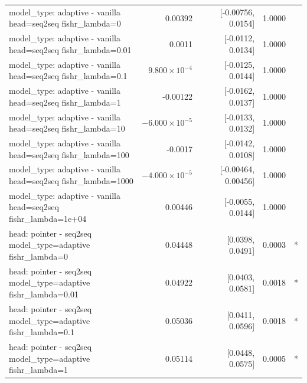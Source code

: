 \documentclass[10pt]{article}
\makeatletter
\newcommand{\stackcell}[1]{\begin{tabular}[t]{@{}l@{}}#1\end{tabular}}
\makeatother
\begin{document}
{\begin{longtable}{lrrrl}
\stackcell{model\_type: adaptive - vanilla\\\footnotesize head=seq2seq fishr\_lambda=0 } & 0.00392 & [-0.00756, 0.0154] & 1.0000 & \\
\stackcell{model\_type: adaptive - vanilla\\\footnotesize head=seq2seq fishr\_lambda=0.01 } & 0.0011 & [-0.0112, 0.0134] & 1.0000 & \\
\stackcell{model\_type: adaptive - vanilla\\\footnotesize head=seq2seq fishr\_lambda=0.1 } & $9.800\times10^{-4}$ & [-0.0125, 0.0144] & 1.0000 & \\
\stackcell{model\_type: adaptive - vanilla\\\footnotesize head=seq2seq fishr\_lambda=1 } & -0.00122 & [-0.0162, 0.0137] & 1.0000 & \\
\stackcell{model\_type: adaptive - vanilla\\\footnotesize head=seq2seq fishr\_lambda=10 } & $-6.000\times10^{-5}$ & [-0.0133, 0.0132] & 1.0000 & \\
\stackcell{model\_type: adaptive - vanilla\\\footnotesize head=seq2seq fishr\_lambda=100 } & -0.0017 & [-0.0142, 0.0108] & 1.0000 & \\
\stackcell{model\_type: adaptive - vanilla\\\footnotesize head=seq2seq fishr\_lambda=1000 } & $-4.000\times10^{-5}$ & [-0.00464, 0.00456] & 1.0000 & \\
\stackcell{model\_type: adaptive - vanilla\\\footnotesize head=seq2seq fishr\_lambda=1e+04 } & 0.00446 & [-0.0055, 0.0144] & 1.0000 & \\
\stackcell{head: pointer - seq2seq\\\footnotesize model\_type=adaptive fishr\_lambda=0 } & 0.04448 & [0.0398, 0.0491] & 0.0003 & *\\
\stackcell{head: pointer - seq2seq\\\footnotesize model\_type=adaptive fishr\_lambda=0.01 } & 0.04922 & [0.0403, 0.0581] & 0.0018 & *\\
\stackcell{head: pointer - seq2seq\\\footnotesize model\_type=adaptive fishr\_lambda=0.1 } & 0.05036 & [0.0411, 0.0596] & 0.0018 & *\\
\stackcell{head: pointer - seq2seq\\\footnotesize model\_type=adaptive fishr\_lambda=1 } & 0.05114 & [0.0448, 0.0575] & 0.0005 & *\\

\end{longtable}}
\end{document}
